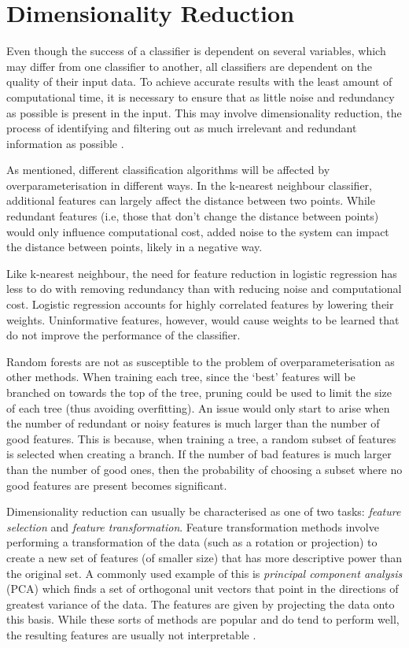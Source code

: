 		
\section{Dimensionality Reduction}

Even though the success of a classifier is dependent on several variables, which may differ from one classifier to another, all classifiers are dependent on the quality of their input data. To achieve accurate results with the least amount of computational time, it is necessary to ensure that as little noise and redundancy as possible is present in the input. This may involve dimensionality reduction, the process of identifying and filtering out as much irrelevant and redundant information as possible \cite{Hall}. 

As mentioned, different classification algorithms will be affected by overparameterisation in different ways. In the k-nearest neighbour classifier, additional features can largely affect the distance between two points. While redundant features (i.e, those that don't change the distance between points) would only influence computational cost, added noise to the system can impact the distance between points, likely in a negative way. 

Like k-nearest neighbour, the need for feature reduction in logistic regression has less to do with removing redundancy than with reducing noise and computational cost. Logistic regression accounts for highly correlated features by lowering their weights. Uninformative features, however, would cause weights to be learned that do not improve the performance of the classifier.

Random forests are not as susceptible to the problem of overparameterisation as other methods. When training each tree, since the `best' features will be branched on towards the top of the tree, pruning could be used to limit the size of each tree (thus avoiding overfitting). An issue would only start to arise when the number of redundant or noisy features is much larger than the number of good features. This is because, when training a tree, a random subset of features is selected when creating a branch. If the number of bad features is much larger than the number of good ones, then the probability of choosing a subset where no good features are present becomes significant.

Dimensionality reduction can usually be characterised as one of two tasks: \textit{feature selection} and \textit{feature transformation}. Feature transformation methods involve performing a transformation of the data (such as a rotation or projection) to create a new set of features (of smaller size) that has more descriptive power than the original set. A commonly used example of this is \textit{principal component analysis} (PCA) which finds a set of orthogonal unit vectors that point in the directions of greatest variance of the data. The features are given by projecting the data onto this basis. While these sorts of methods are popular and do tend to perform well, the resulting features are usually not interpretable \cite{Guyon}. 

